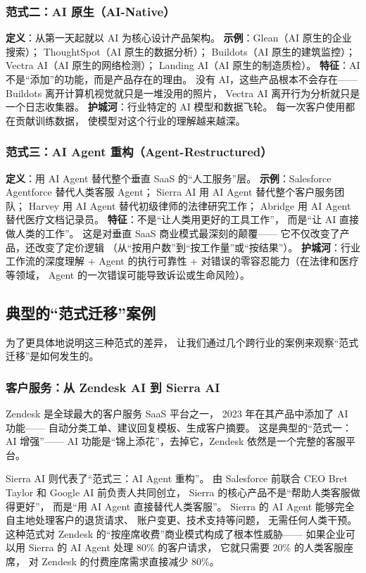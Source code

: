 \subsubsection{范式二：AI 原生（AI-Native）}
\textbf{定义}：从第一天起就以 AI 为核心设计产品架构。
\textbf{示例}：Glean（AI 原生的企业搜索）；
ThoughtSpot（AI 原生的数据分析）；
Buildots（AI 原生的建筑监控）；
Vectra AI（AI 原生的网络检测）；
Landing AI（AI 原生的制造质检）。
\textbf{特征}：AI 不是``添加''的功能，而是产品存在的理由。
没有 AI，这些产品根本不会存在——
Buildots 离开计算机视觉就只是一堆没用的照片，
Vectra AI 离开行为分析就只是一个日志收集器。
\textbf{护城河}：行业特定的 AI 模型和数据飞轮。
每一次客户使用都在贡献训练数据，
使模型对这个行业的理解越来越深。

\subsubsection{范式三：AI Agent 重构（Agent-Restructured）}
\textbf{定义}：用 AI Agent 替代整个垂直 SaaS 的``人工服务''层。
\textbf{示例}：Salesforce Agentforce 替代人类客服 Agent；
Sierra AI 用 AI Agent 替代整个客户服务团队；
Harvey 用 AI Agent 替代初级律师的法律研究工作；
Abridge 用 AI Agent 替代医疗文档记录员。
\textbf{特征}：不是``让人类用更好的工具工作''，
而是``让 AI 直接做人类的工作''。
这是对垂直 SaaS 商业模式最深刻的颠覆——
它不仅改变了产品，还改变了定价逻辑
（从``按用户数''到``按工作量''或``按结果''）。
\textbf{护城河}：行业工作流的深度理解 + Agent 的执行可靠性 +
对错误的零容忍能力（在法律和医疗等领域，
Agent 的一次错误可能导致诉讼或生命风险）。

\subsection{典型的``范式迁移''案例}

为了更具体地说明这三种范式的差异，
让我们通过几个跨行业的案例来观察``范式迁移''是如何发生的。

\subsubsection{客户服务：从 Zendesk AI 到 Sierra AI}
Zendesk 是全球最大的客户服务 SaaS 平台之一，
2023 年在其产品中添加了 AI 功能——
自动分类工单、建议回复模板、生成客户摘要。
这是典型的``范式一：AI 增强''——
AI 功能是``锦上添花''，去掉它，Zendesk 依然是一个完整的客服平台。

Sierra AI 则代表了``范式三：AI Agent 重构''。
由 Salesforce 前联合 CEO Bret Taylor 和 Google AI 前负责人共同创立，
Sierra 的核心产品不是``帮助人类客服做得更好''，
而是``用 AI Agent 直接替代人类客服''。
Sierra 的 AI Agent 能够完全自主地处理客户的退货请求、
账户变更、技术支持等问题，
无需任何人类干预。
这种范式对 Zendesk 的``按座席收费''商业模式构成了根本性威胁——
如果企业可以用 Sierra 的 AI Agent 处理 80\% 的客户请求，
它就只需要 20\% 的人类客服座席，
对 Zendesk 的付费座席需求直接减少 80\%。

